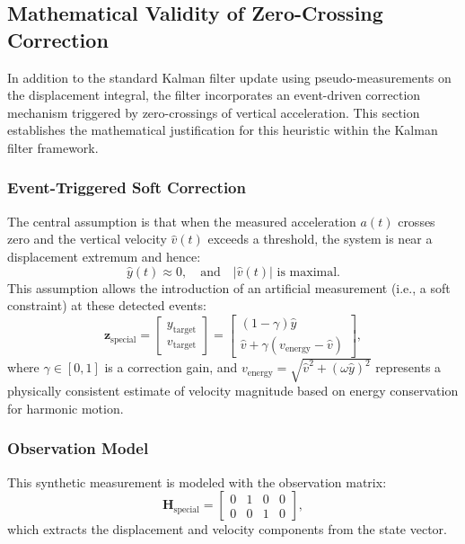 \documentclass[11pt,letterpaper]{article}
\begin{document}
\subsection{Mathematical Validity of Zero-Crossing Correction}

In addition to the standard Kalman filter update using pseudo-measurements on the displacement integral, the filter incorporates an event-driven correction mechanism triggered by zero-crossings of vertical acceleration. This section establishes the mathematical justification for this heuristic within the Kalman filter framework.

\subsubsection*{Event-Triggered Soft Correction}

The central assumption is that when the measured acceleration $a(t)$ crosses zero and the vertical velocity $\hat{v}(t)$ exceeds a threshold, the system is near a displacement extremum and hence:
\begin{equation}
    \hat{y}(t) \approx 0, \quad \text{and} \quad |\hat{v}(t)| \text{ is maximal}.
\end{equation}
This assumption allows the introduction of an artificial measurement (i.e., a soft constraint) at these detected events:
\begin{equation}
    \bm{z}_\mathrm{special} =
    \begin{bmatrix}
        y_\mathrm{target} \\
        v_\mathrm{target}
    \end{bmatrix}
    =
    \begin{bmatrix}
        (1 - \gamma)\hat{y} \\
        \hat{v} + \gamma \left(v_\mathrm{energy} - \hat{v} \right)
    \end{bmatrix},
\end{equation}
where $\gamma \in [0, 1]$ is a correction gain, and $v_\mathrm{energy} = \sqrt{\hat{v}^2 + (\omega \hat{y})^2}$ represents a physically consistent estimate of velocity magnitude based on energy conservation for harmonic motion.

\subsubsection*{Observation Model}

This synthetic measurement is modeled with the observation matrix:
\begin{equation}
    \bm{H}_\mathrm{special} = 
    \begin{bmatrix}
        0 & 1 & 0 & 0 \\
        0 & 0 & 1 & 0
    \end{bmatrix},
\end{equation}
which extracts the displacement and velocity components from the state vector.
\end{document}
